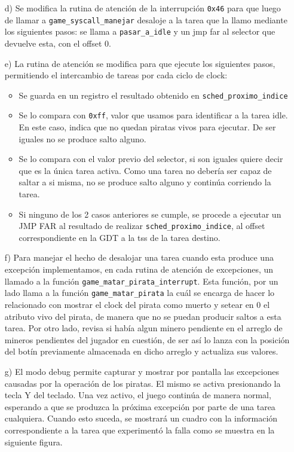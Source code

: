 \begin{enumerate}
\item[d)] Se modifica la rutina de atención de la interrupción {\tt 0x46} para que luego de llamar a {\tt game\_syscall\_manejar} desaloje a la tarea que la llamo mediante los siguientes pasos: se llama a {\tt pasar\_a\_idle} y un jmp far al selector que devuelve esta, con el offset 0.

\item[e)] La rutina de atención se modifica para que ejecute los siguientes pasos, permitiendo el intercambio de tareas por cada ciclo de clock:
   \begin{itemize}
	\item Se guarda en un registro el resultado obtenido en {\tt sched_proximo_indice}
	\item Se lo compara con {\tt 0xff}, valor que usamos para identificar a la tarea idle. En este caso, indica que no quedan piratas vivos para ejecutar. De ser iguales no se produce salto alguno.
	\item Se lo compara con el valor previo del selector, si son iguales quiere decir que es la única tarea activa. Como una tarea no debería ser capaz de saltar a si misma, no se produce salto alguno y continúa corriendo la tarea.
	\item Si ninguno de los 2 casos anteriores se cumple, se procede a ejecutar un JMP FAR al resultado de realizar {\tt sched_proximo_indice}, al offset correspondiente en la GDT a la tss de la tarea destino.
	\end{itemize}
	
\item[f)] Para manejar el hecho de desalojar una tarea cuando esta produce una excepción implementamos, en cada rutina de atención de excepciones, un llamado a la función {\tt game\_matar\_pirata\_interrupt}. Esta función, por un lado llama a la función {\tt game\_matar\_pirata} la cuál se encarga de hacer lo relacionado con mostrar el clock del pirata como muerto y setear en 0 el atributo vivo del pirata, de manera que no se puedan producir saltos a esta tarea. Por otro lado, revisa si había algun minero pendiente en el arreglo de mineros pendientes del jugador en cuestión, de ser así lo lanza con la posición del botín previamente almacenada en dicho arreglo y actualiza sus valores.

\item[g)] El modo debug permite capturar y mostrar por pantalla las excepciones causadas por la operación de los piratas. El mismo se activa presionando la tecla Y del teclado. Una vez activo, el juego continúa de manera normal, esperando a que se produzca la próxima excepción por parte de una tarea cualquiera. Cuando esto suceda, se mostrará un cuadro con la información correspondiente a la tarea que experimentó la falla como se muestra en la siguiente figura.


\end{enumerate}
